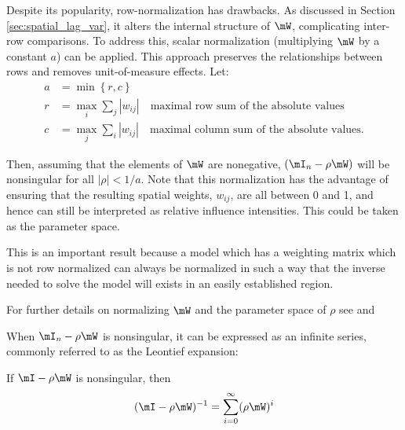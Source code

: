 \documentclass[english,12pt]{book}\usepackage[]{graphicx}\usepackage[]{xcolor}
\begin{document}
Despite its popularity, row-normalization has drawbacks. As discussed in Section \ref{sec:spatial_lag_var}, it alters the internal structure of $\mW$, complicating inter-row comparisons. To address this, scalar normalization (multiplying $\mW$ by a constant $a$) can be applied. This approach preserves the relationships between rows and removes unit-of-measure effects. Let:
\begin{equation*}
  \begin{aligned}
    a & = \min \left\lbrace r, c \right\rbrace \\
    r & = \max_i \sum_j \left|w_{ij}\right|\quad \mbox{maximal row sum of the absolute values} \\
    c & = \max_j \sum_i \left|w_{ij}\right|\quad \mbox{maximal column sum of the absolute values}.
  \end{aligned}
\end{equation*}

Then, assuming that the elements of $\mW$ are nonegative, $(\mI_n - \rho\mW)$ will be nonsingular for all $\left|\rho\right| < 1/a$. Note that this normalization has the advantage of ensuring that the resulting spatial weights, $w_{ij}$, are all between 0 and 1, and hence can still be interpreted as relative influence intensities. This could be taken as the parameter space. 

This is an important result because a model which has a weighting matrix which is not row normalized can always be normalized in such a way that the inverse needed to solve the model will exists in an easily established region. 


\begin{remark}
For further details on normalizing $\mW$ and the parameter space of $\rho$ see \citet[][section 2.4]{elhorst2014spatial} and \citet[][section 2.2]{kelejian2010specification}
\end{remark}

When $\mI_n - \rho\mW$ is nonsingular, it can be expressed as an infinite series, commonly referred to as the Leontief expansion:

\begin{lemma}\label{lemma:Leontief}
If $\mI - \rho \mW$ is nonsingular, then
	\begin{equation*}
	(\mI - \rho \mW)^{-1} = \sum_{i = 0} ^{\infty}(\rho \mW)^{i}
	\end{equation*}
\end{lemma}
\end{document}
